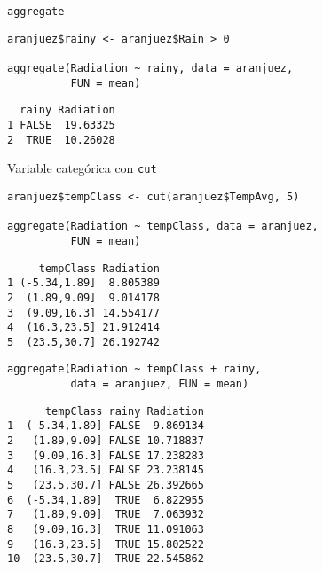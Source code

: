 \documentclass[xcolor={usenames,svgnames,dvipsnames}]{beamer}
\begin{document}
\begin{frame}[fragile,label=sec-4-1]{\texttt{aggregate}}
 \lstset{language=R,label= ,caption= ,numbers=none}
\begin{lstlisting}
aranjuez$rainy <- aranjuez$Rain > 0

aggregate(Radiation ~ rainy, data = aranjuez,
          FUN = mean)
\end{lstlisting}

\begin{verbatim}
  rainy Radiation
1 FALSE  19.63325
2  TRUE  10.26028
\end{verbatim}
\end{frame}

\begin{frame}[fragile,label=sec-4-2]{Variable categórica con \texttt{cut}}
 \lstset{language=R,label= ,caption= ,numbers=none}
\begin{lstlisting}
aranjuez$tempClass <- cut(aranjuez$TempAvg, 5)

aggregate(Radiation ~ tempClass, data = aranjuez,
          FUN = mean)
\end{lstlisting}

\begin{verbatim}
     tempClass Radiation
1 (-5.34,1.89]  8.805389
2  (1.89,9.09]  9.014178
3  (9.09,16.3] 14.554177
4  (16.3,23.5] 21.912414
5  (23.5,30.7] 26.192742
\end{verbatim}

\lstset{language=R,label= ,caption= ,numbers=none}
\begin{lstlisting}
aggregate(Radiation ~ tempClass + rainy,
          data = aranjuez, FUN = mean)
\end{lstlisting}

\begin{verbatim}
      tempClass rainy Radiation
1  (-5.34,1.89] FALSE  9.869134
2   (1.89,9.09] FALSE 10.718837
3   (9.09,16.3] FALSE 17.238283
4   (16.3,23.5] FALSE 23.238145
5   (23.5,30.7] FALSE 26.392665
6  (-5.34,1.89]  TRUE  6.822955
7   (1.89,9.09]  TRUE  7.063932
8   (9.09,16.3]  TRUE 11.091063
9   (16.3,23.5]  TRUE 15.802522
10  (23.5,30.7]  TRUE 22.545862
\end{verbatim}
\end{frame}
\end{document}
